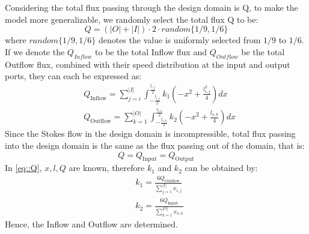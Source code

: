 \documentclass{article}
\begin{document}
Considering the total flux passing through the design domain is Q,  to make the model more generalizable, we randomly select the total flux Q to be:
\begin{equation}
    Q = \left(|O| + |I|\right) \cdot 2 \cdot random\{1/9, 1/6 \}
\end{equation}
where $random\{1/9, 1/6 \}$ denotes the value is uniformly selected from $1/9$ to $1/6$.  If we denote the 
$Q_{Inflow}$ to be the total Inflow flux and $Q_{Outflow}$ be the total Outflow flux, combined with their speed distribution at the input and output ports, they can each be expressed as:  
\begin{equation}\label{eq::Q}
\begin{aligned}
& Q_{\text {Inflow}}=\sum_{j=i}^{|I|} \int_{-\frac{l_{i, j}}{2}}^{\frac{l_{i, j}}{2}} k_1\left(-x^2+\frac{l_{i, j}^2}{4}\right) d x \\
& Q_{\text {Outflow}}=\sum_{k=1}^{\mid O|} \int_{-\frac{l_{o, k}}{2}}^{\frac{l_{o, k}}{2}} k_2\left(-x^2+\frac{l_{o, k}}{4}\right) d x
\end{aligned}
\end{equation}
Since the Stokes flow in the design domain is incompressible, total flux passing into the design domain is the same as the flux passing out of the domain, that is:
\begin{equation}
    Q = Q_{\text{Input}} = Q_{\text{Output}}
\end{equation}
In \eqref{eq::Q}, $x, l, Q$ are known, therefore $k_1$ and $k_2$ can be obtained by:
\begin{equation} \label{Eq::k1k2}
\begin{aligned}
& k_1=\frac{6 Q_{\text{Outflow}}}{\sum_{j = 1}^{|I|} x_{i,j}} \\
& k_2=\frac{6 Q_{\text{Input}}}{\sum_{k = 1}^{|O|} x_{o,k}}
\end{aligned}
\end{equation}
Hence, the Inflow and Outflow are determined.
\end{document}
